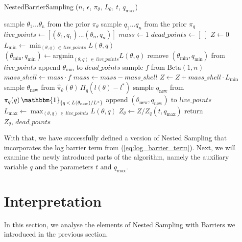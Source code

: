 \documentclass[12pt, a4paper]{report}
\begin{document}
\begin{algorithm}
    \caption[Nested Sampling with the log barrier term.]{NestedBarrierSampling ($n$, $\epsilon$, $\pi_\theta$, $L_\theta$, $t$, $q_{\textrm{max}}$)}
    \label{alg:barriersampling}
    \begin{algorithmic}
        \State sample $\theta_1 ... \theta_n$ from the prior $\pi_\theta$
        \State sample $q_1 ... q_n$ from the prior $\pi_q$
        \State $live\_points \gets [ (\theta_1, q_1) ... (\theta_n, q_n) ]$
        \State $mass \gets 1$
        \State $dead\_points \gets [ \; ]$
        \State $Z \gets 0$
        \Repeat
            \State $L_{\textrm{min}} \gets \min_{(\theta,q) \, \in \, live\_points} L(\theta, q)$ 
            \State $(\theta_{\textrm{min}}, q_{\textrm{min}}) \gets \textrm{argmin}_{(\theta,q) \, \in \, live\_points} L(\theta, q)$ 
            \State remove $(\theta_{\textrm{min}}, q_{\textrm{min}})$ from $live\_points$
            \State append $\theta_{\textrm{min}}$ to $dead\_points$
            \State sample $f$ from  $\textrm{Beta}(1, n)$
            \State $mass\_shell \gets mass \cdot f$
            \State $mass \gets mass - mass\_shell$
            \State $Z \gets Z + mass\_shell \cdot L_{\textrm{min}}$
            \State sample $\theta_{\textrm{new}}$ from $\hat{\pi}_\theta(\theta) \, \Pi_q(l(\theta) - l^*)$
            \State sample $q_{\textrm{new}}$ from $\pi_q(q) \, \mathbbm{1}_{\{q \,<\, L(\theta_{\textrm{new}}) / L^*\}}$
            \State append $(\theta_{\textrm{new}}, q_{\textrm{new}})$ to $live\_points$
            \State $L_{\textrm{max}} \gets \max_{(\theta,q) \, \in \, live\_points} L(\theta, q)$ 
        \State $Z_\theta \gets Z / Z_q(t, q_{\textrm{max}})$
        \State return $Z_\theta,\, dead\_points$
    \end{algorithmic}
\end{algorithm}

With that, we have successfully defined a version of Nested Sampling that incorporates the log barrier term from (\ref{eq:log_barrier_term}).
Next, we will examine the newly introduced parts of the algorithm, namely the auxiliary variable $q$ and the parameters $t$ and $q_{\textrm{max}}$.

\FloatBarrier
\section{Interpretation}
In this section, we analyse the elements of Nested Sampling with Barriers we introduced in the previous section.
\end{document}
